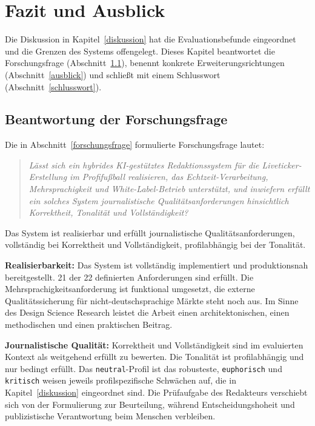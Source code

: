 \chapter{Fazit und Ausblick}\label{fazit-und-ausblick}

Die Diskussion in Kapitel~\ref{diskussion} hat die Evaluationsbefunde eingeordnet und die Grenzen des Systems offengelegt. Dieses Kapitel beantwortet die Forschungsfrage (Abschnitt~\ref{beantwortung-der-forschungsfrage}), benennt konkrete Erweiterungsrichtungen (Abschnitt~\ref{ausblick}) und schließt mit einem Schlusswort (Abschnitt~\ref{schlusswort}).
\section{Beantwortung der Forschungsfrage}\label{beantwortung-der-forschungsfrage}

Die in Abschnitt~\ref{forschungsfrage} formulierte Forschungsfrage lautet:

\begin{quote}
\emph{Lässt sich ein hybrides KI-gestütztes Redaktionssystem für die
Liveticker-Erstellung im Profifußball realisieren, das
Echtzeit-Verarbeitung, Mehrsprachigkeit und White-Label-Betrieb
unterstützt, und inwiefern erfüllt ein solches System journalistische
Qualitätsanforderungen hinsichtlich Korrektheit, Tonalität und
Vollständigkeit?}
\end{quote}

Das System ist realisierbar und erfüllt journalistische Qualitätsanforderungen, vollständig bei Korrektheit und Vollständigkeit, profilabhängig bei der Tonalität.

\textbf{Realisierbarkeit:} Das System ist vollständig implementiert und produktionsnah bereitgestellt. 21 der 22 definierten Anforderungen sind erfüllt. Die Mehrsprachigkeitsanforderung ist funktional umgesetzt, die externe Qualitätssicherung für nicht-deutschsprachige Märkte steht noch aus. Im Sinne des Design Science Research \cite{hevner2004} leistet die Arbeit einen architektonischen, einen methodischen und einen praktischen Beitrag.

\textbf{Journalistische Qualität:} Korrektheit und Vollständigkeit sind im evaluierten Kontext als weitgehend erfüllt zu bewerten. Die Tonalität ist profilabhängig und nur bedingt erfüllt. Das \texttt{neutral}-Profil ist das robusteste, \texttt{euphorisch} und \texttt{kritisch} weisen jeweils profilspezifische Schwächen auf, die in Kapitel~\ref{diskussion} eingeordnet sind. Die Prüfaufgabe des Redakteurs verschiebt sich von der Formulierung zur Beurteilung, während Entscheidungshoheit und publizistische Verantwortung beim Menschen verbleiben.



